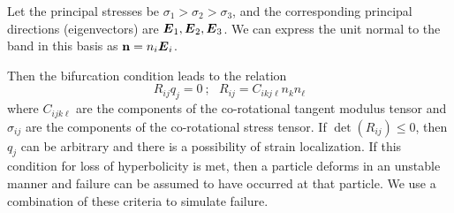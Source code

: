 Let the principal stresses be $\sigma_1 > \sigma_2 > \sigma_3$, and the 
corresponding principal directions (eigenvectors) are $\boldsymbol{E}_1, \boldsymbol{E}_2, \boldsymbol{E}_3$.
We can express the unit normal to the band in this basis as $\mathbf{n} = n_i \boldsymbol{E}_i$.

Then the bifurcation condition leads to the relation 
\begin{equation} 
  R_{ij} q_{j} = 0 ~;~~~
  R_{ij} = C_{ikj\ell} n_k n_\ell 
\end{equation} 
where $C_{ijk\ell}$ are the components of the co-rotational tangent
modulus tensor and $\sigma_{ij}$ are the components of the co-rotational 
stress tensor.  If $\det(R_{ij}) \le 0 $, then $q_j$ can be arbitrary and 
there is a possibility of strain localization.  If this condition for 
loss of hyperbolicity is met,  then a particle deforms in an unstable 
manner and failure can be assumed to have occurred at that particle.  
We use a combination of these criteria to simulate failure.

